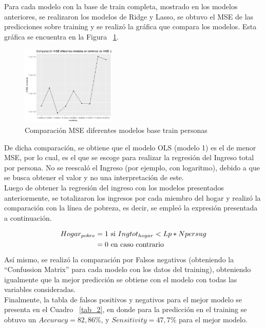 \documentclass[conference, 10pt]{IEEEtran}
\begin{document}
Para cada modelo con la base de train completa, mostrado en los modelos anteriores, se realizaron los modelos de Ridge y Lasso, se obtuvo el MSE de las predicciones sobre training y se realizó la gráfica que compara los modelos. Esta gráfica se encuentra en la Figura ~\ref{fig1}.  

\begin{figure}[htbp]
\centerline{\includegraphics[width=0.4\textwidth]{../Vistas/MSE_base_training.png}}
\caption{Comparación MSE diferentes modelos base train personas}
\label{fig1}
\end{figure}

De dicha comparación, se obtiene que el modelo OLS (modelo 1) es el de menor MSE, por lo cual, es el que se escoge para realizar la regresión del Ingreso total por persona. No se reescaló el Ingreso (por ejemplo, con logaritmo), debido a que se busca obtener el valor y no una interpretación de este.\\
Luego de obtener la regresión del ingreso con los modelos presentados anteriormente, se totalizaron los ingresos por cada miembro del hogar y realizó la comparación con la línea de pobreza, es decir, se empleó la expresión presentada a continuación.  

\begin{align}
Hogar_{pobre}&=1 \textnormal{ si } Ingtot_{hogar}<Lp*Npersug\\
       &=0 \textnormal{ en caso contrario}
\end{align}
Así mismo, se realizó la comparación por Falsos negativos (obteniendo la ``Confussion Matrix'' para cada modelo con los datos del training), obteniendo igualmente que la mejor predicción se obtiene con el modelo con todas las variables consideradas.\\

Finalmente, la tabla de falsos positivos y negativos para el mejor modelo se presenta en el Cuadro ~\ref{tab_2}, en donde para la predicción en el training se obtuvo un $Accuracy=82,86\%$, y $Sensitivity=47,7\%$ para el mejor modelo.
\end{document}
